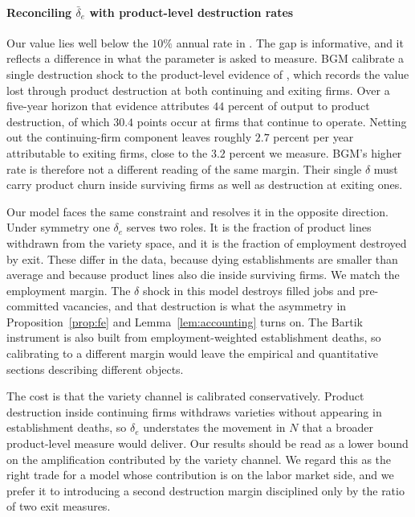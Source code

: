 \documentclass[authoryear, review, 12pt]{elsarticle}
\begin{document}
	\paragraph{Reconciling $\bar\delta_e$ with product-level destruction rates}
	Our value lies well below the $10\%$ annual rate in \citet{bilbiie_2012}. The
	gap is informative, and it reflects a difference in what the parameter is asked
	to measure. BGM calibrate a single destruction shock to the product-level
	evidence of \citet{bernard_2010}, which records the value lost through product
	destruction at both continuing and exiting firms. Over a five-year horizon that
	evidence attributes $44$ percent of output to product destruction, of which
	$30.4$ points occur at firms that continue to operate. Netting out the
	continuing-firm component leaves roughly $2.7$ percent per year attributable to
	exiting firms, close to the $3.2$ percent we measure. BGM's higher rate is
	therefore not a different reading of the same margin. Their single $\delta$ must
	carry product churn inside surviving firms as well as destruction at exiting
	ones.

	Our model faces the same constraint and resolves it in the opposite direction.
	Under symmetry one $\delta_e$ serves two roles. It is the fraction of product
	lines withdrawn from the variety space, and it is the fraction of employment
	destroyed by exit. These differ in the data, because dying establishments are
	smaller than average and because product lines also die inside surviving firms.
	We match the employment margin. The $\delta$ shock in this model destroys filled
	jobs and pre-committed vacancies, and that destruction is what the asymmetry in
	Proposition~\ref{prop:fe} and Lemma~\ref{lem:accounting} turns on. The Bartik instrument is also
	built from employment-weighted establishment deaths, so calibrating to a
	different margin would leave the empirical and quantitative sections describing
	different objects.

	The cost is that the variety channel is calibrated conservatively. Product
	destruction inside continuing firms withdraws varieties without appearing in
	establishment deaths, so $\delta_e$ understates the movement in $N$ that a
	broader product-level measure would deliver. Our results should be read as a
	lower bound on the amplification contributed by the variety channel. We regard
	this as the right trade for a model whose contribution is on the labor market
	side, and we prefer it to introducing a second destruction margin disciplined
	only by the ratio of two exit measures.
	
\end{document}

